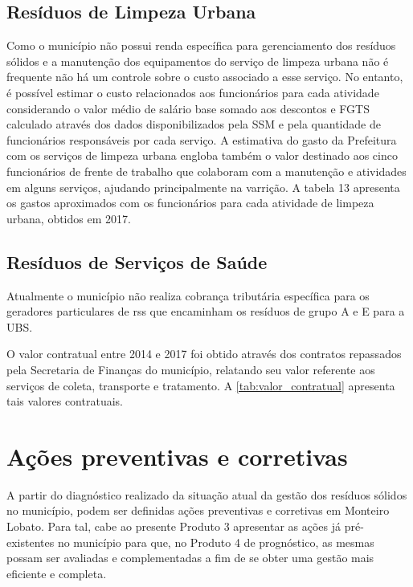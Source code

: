	\subsection{Resíduos de Limpeza Urbana}
	Como o município não possui renda específica para gerenciamento dos resíduos sólidos e a manutenção dos equipamentos do serviço de limpeza urbana não é frequente não há um controle sobre o custo associado a esse serviço. No entanto, é possível estimar o custo relacionados aos funcionários para cada atividade considerando o valor médio de salário base somado aos descontos e FGTS calculado através dos dados disponibilizados pela SSM e pela quantidade de funcionários responsáveis por cada serviço. A estimativa do gasto da Prefeitura com os serviços de limpeza urbana engloba também o valor destinado aos cinco funcionários de frente de trabalho que colaboram com a manutenção e atividades em alguns serviços, ajudando principalmente na varrição.  A tabela 13 apresenta os gastos aproximados com os funcionários para cada atividade de limpeza urbana, obtidos em 2017.
	
	
	
	\subsection{Resíduos de Serviços de Saúde}
	Atualmente o município não realiza cobrança tributária específica para os geradores particulares de \gls{rss} que encaminham os resíduos de grupo A e E para a UBS.
	
	O valor contratual entre 2014 e 2017 foi obtido através dos contratos repassados pela Secretaria de Finanças do município, relatando seu valor referente aos serviços de coleta, transporte e tratamento. A \autoref{tab:valor_contratual} apresenta tais valores contratuais.
	
	
	
\section{Ações preventivas e corretivas}
A partir do diagnóstico realizado da situação atual da gestão dos resíduos sólidos no município, podem ser definidas ações preventivas e corretivas em Monteiro Lobato. Para tal, cabe ao presente Produto 3 apresentar as ações já pré-existentes no município para que, no Produto 4 de prognóstico, as mesmas possam ser avaliadas e complementadas a fim de se obter uma gestão mais eficiente e completa.

